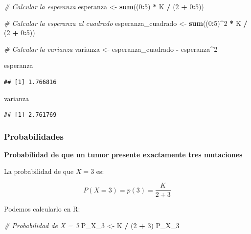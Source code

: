 \documentclass[
]{article}
\newenvironment{Shaded}{\begin{snugshade}}{\end{snugshade}}
\newcommand{\CommentTok}[1]{\textcolor[rgb]{0.56,0.35,0.01}{\textit{#1}}}
\newcommand{\DecValTok}[1]{\textcolor[rgb]{0.00,0.00,0.81}{#1}}
\newcommand{\FunctionTok}[1]{\textcolor[rgb]{0.13,0.29,0.53}{\textbf{#1}}}
\newcommand{\NormalTok}[1]{#1}
\newcommand{\OtherTok}[1]{\textcolor[rgb]{0.56,0.35,0.01}{#1}}
\newcommand{\SpecialCharTok}[1]{\textcolor[rgb]{0.81,0.36,0.00}{\textbf{#1}}}
\begin{document}
\begin{Shaded}
\begin{Highlighting}[]
\CommentTok{\# Calcular la esperanza}
\NormalTok{esperanza }\OtherTok{\textless{}{-}} \FunctionTok{sum}\NormalTok{((}\DecValTok{0}\SpecialCharTok{:}\DecValTok{5}\NormalTok{) }\SpecialCharTok{*}\NormalTok{ K }\SpecialCharTok{/}\NormalTok{ (}\DecValTok{2} \SpecialCharTok{+} \DecValTok{0}\SpecialCharTok{:}\DecValTok{5}\NormalTok{))}

\CommentTok{\# Calcular la esperanza al cuadrado}
\NormalTok{esperanza\_cuadrado }\OtherTok{\textless{}{-}} \FunctionTok{sum}\NormalTok{((}\DecValTok{0}\SpecialCharTok{:}\DecValTok{5}\NormalTok{)}\SpecialCharTok{\^{}}\DecValTok{2} \SpecialCharTok{*}\NormalTok{ K }\SpecialCharTok{/}\NormalTok{ (}\DecValTok{2} \SpecialCharTok{+} \DecValTok{0}\SpecialCharTok{:}\DecValTok{5}\NormalTok{))}

\CommentTok{\# Calcular la varianza}
\NormalTok{varianza }\OtherTok{\textless{}{-}}\NormalTok{ esperanza\_cuadrado }\SpecialCharTok{{-}}\NormalTok{ esperanza}\SpecialCharTok{\^{}}\DecValTok{2}

\NormalTok{esperanza}
\end{Highlighting}
\end{Shaded}

\begin{verbatim}
## [1] 1.766816
\end{verbatim}

\begin{Shaded}
\begin{Highlighting}[]
\NormalTok{varianza}
\end{Highlighting}
\end{Shaded}

\begin{verbatim}
## [1] 2.761769
\end{verbatim}

\subsubsection{Probabilidades}\label{probabilidades}

\textbf{Probabilidad de que un tumor presente exactamente tres mutaciones}

La probabilidad de que \(X = 3\) es:

\[
P(X = 3) = p(3) = \frac{K}{2+3}
\]

Podemos calcularlo en R:

\begin{Shaded}
\begin{Highlighting}[]
\CommentTok{\# Probabilidad de X = 3}
\NormalTok{P\_X\_3 }\OtherTok{\textless{}{-}}\NormalTok{ K }\SpecialCharTok{/}\NormalTok{ (}\DecValTok{2} \SpecialCharTok{+} \DecValTok{3}\NormalTok{)}
\NormalTok{P\_X\_3}
\end{Highlighting}
\end{Shaded}
\end{document}
